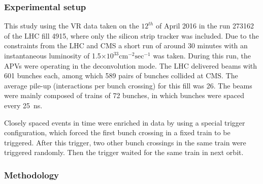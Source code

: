 \subsubsection{Experimental setup} 

This study using the VR data taken on the $12^{th}$ of April 2016 in the run 273162 of the LHC fill 4915, where only the silicon strip tracker was included. Due to the constraints from the LHC and CMS a short run of around 30 minutes with an instantaneous luminosity of 1.5$\times 10^{33} \mathrm{cm^{-2} sec^{-1}}$ was taken. During this run, the APVs were operating in the deconvolution mode. The LHC delivered beams with 601 bunches each, among which 589 pairs of bunches collided at CMS. The average pile-up (interactions per bunch crossing) for this fill was 26. The beams were mainly composed of trains of 72 bunches, in which bunches were spaced every 25~ns.

Closely spaced events in time were enriched in data by using a special trigger configuration, which forced the first bunch crossing in a fixed train to be triggered. After this trigger, two other bunch crossings in the same train were triggered randomly. Then the trigger waited for the same train in next orbit. 





 \subsubsection{Methodology}
 


